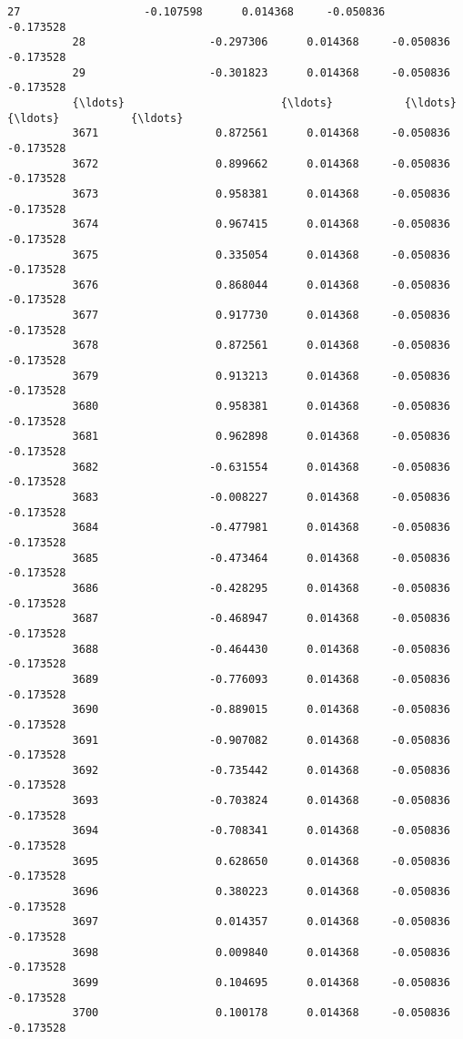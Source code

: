 \documentclass[11pt]{article}
\begin{document}
\begin{Verbatim}[commandchars=\\\{\}]
          27                   -0.107598      0.014368     -0.050836     -0.173528   
          28                   -0.297306      0.014368     -0.050836     -0.173528   
          29                   -0.301823      0.014368     -0.050836     -0.173528   
          {\ldots}                        {\ldots}           {\ldots}           {\ldots}           {\ldots}   
          3671                  0.872561      0.014368     -0.050836     -0.173528   
          3672                  0.899662      0.014368     -0.050836     -0.173528   
          3673                  0.958381      0.014368     -0.050836     -0.173528   
          3674                  0.967415      0.014368     -0.050836     -0.173528   
          3675                  0.335054      0.014368     -0.050836     -0.173528   
          3676                  0.868044      0.014368     -0.050836     -0.173528   
          3677                  0.917730      0.014368     -0.050836     -0.173528   
          3678                  0.872561      0.014368     -0.050836     -0.173528   
          3679                  0.913213      0.014368     -0.050836     -0.173528   
          3680                  0.958381      0.014368     -0.050836     -0.173528   
          3681                  0.962898      0.014368     -0.050836     -0.173528   
          3682                 -0.631554      0.014368     -0.050836     -0.173528   
          3683                 -0.008227      0.014368     -0.050836     -0.173528   
          3684                 -0.477981      0.014368     -0.050836     -0.173528   
          3685                 -0.473464      0.014368     -0.050836     -0.173528   
          3686                 -0.428295      0.014368     -0.050836     -0.173528   
          3687                 -0.468947      0.014368     -0.050836     -0.173528   
          3688                 -0.464430      0.014368     -0.050836     -0.173528   
          3689                 -0.776093      0.014368     -0.050836     -0.173528   
          3690                 -0.889015      0.014368     -0.050836     -0.173528   
          3691                 -0.907082      0.014368     -0.050836     -0.173528   
          3692                 -0.735442      0.014368     -0.050836     -0.173528   
          3693                 -0.703824      0.014368     -0.050836     -0.173528   
          3694                 -0.708341      0.014368     -0.050836     -0.173528   
          3695                  0.628650      0.014368     -0.050836     -0.173528   
          3696                  0.380223      0.014368     -0.050836     -0.173528   
          3697                  0.014357      0.014368     -0.050836     -0.173528   
          3698                  0.009840      0.014368     -0.050836     -0.173528   
          3699                  0.104695      0.014368     -0.050836     -0.173528   
          3700                  0.100178      0.014368     -0.050836     -0.173528   
          

\end{Verbatim}
\end{document}
